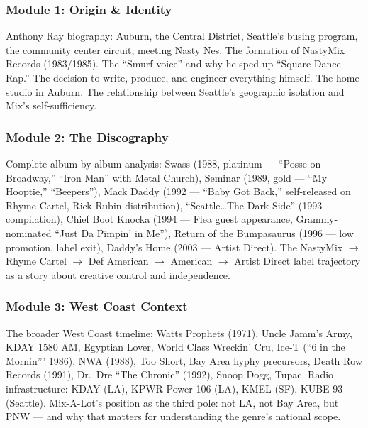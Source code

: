 \documentclass[11pt,letterpaper]{article}
\begin{document}
\subsubsection{Module 1: Origin \& Identity}
Anthony Ray biography: Auburn, the Central District, Seattle's busing program, the community center circuit, meeting Nasty Nes. The formation of NastyMix Records (1983/1985). The ``Smurf voice'' and why he sped up ``Square Dance Rap.'' The decision to write, produce, and engineer everything himself. The home studio in Auburn. The relationship between Seattle's geographic isolation and Mix's self-sufficiency.

\subsubsection{Module 2: The Discography}
Complete album-by-album analysis: Swass (1988, platinum --- ``Posse on Broadway,'' ``Iron Man'' with Metal Church), Seminar (1989, gold --- ``My Hooptie,'' ``Beepers''), Mack Daddy (1992 --- ``Baby Got Back,'' self-released on Rhyme Cartel, Rick Rubin distribution), ``Seattle\ldots The Dark Side'' (1993 compilation), Chief Boot Knocka (1994 --- Flea guest appearance, Grammy-nominated ``Just Da Pimpin' in Me''), Return of the Bumpasaurus (1996 --- low promotion, label exit), Daddy's Home (2003 --- Artist Direct). The NastyMix $\rightarrow$ Rhyme Cartel $\rightarrow$ Def American $\rightarrow$ American $\rightarrow$ Artist Direct label trajectory as a story about creative control and independence.

\subsubsection{Module 3: West Coast Context}
The broader West Coast timeline: Watts Prophets (1971), Uncle Jamm's Army, KDAY 1580 AM, Egyptian Lover, World Class Wreckin' Cru, Ice-T (``6 in the Mornin''' 1986), NWA (1988), Too Short, Bay Area hyphy precursors, Death Row Records (1991), Dr.~Dre ``The Chronic'' (1992), Snoop Dogg, Tupac. Radio infrastructure: KDAY (LA), KPWR Power 106 (LA), KMEL (SF), KUBE 93 (Seattle). Mix-A-Lot's position as the third pole: not LA, not Bay Area, but PNW --- and why that matters for understanding the genre's national scope.
\end{document}
